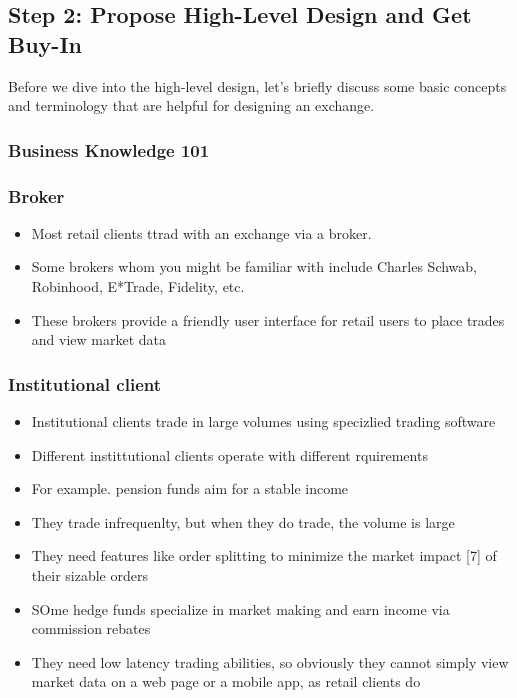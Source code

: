 \documentclass{report}
\theoremstyle{definition}
\let\oldsubsection\subsection
\let\oldsubsubsection\subsubsection
\renewcommand{\subsection}{\oldsubsection*}
\renewcommand{\subsubsection}{\oldsubsubsection*}
\begin{document}
\subsection{Step 2: Propose High-Level Design and Get Buy-In}

Before we dive into the high-level design, let's briefly discuss some basic concepts and terminology that are helpful for designing an exchange.

\subsubsection{Business Knowledge 101}

\subsubsection{Broker}

\begin{itemize}
\item
Most retail clients ttrad with an exchange via a broker.
\item
Some brokers whom you might be familiar with include Charles Schwab, Robinhood, E*Trade, Fidelity, etc.
\item
These brokers provide a friendly user interface for retail users to place trades and view market data
\end{itemize}

\subsubsection{Institutional client}

\begin{itemize}
\item
Institutional clients trade in large volumes using specizlied trading software
\item
Different instittutional clients operate with different rquirements
\item
For example. pension  funds aim for a stable income
\item
They trade infrequenlty, but when they do trade, the volume is large
\item
They need features like order splitting to minimize the market impact [7] of their sizable orders
\item
SOme hedge funds specialize in market making and earn income via commission rebates
\item
They need low latency trading abilities, so obviously they cannot simply view market data on a web page or a mobile app, as retail clients do
\end{itemize}
\end{document}
